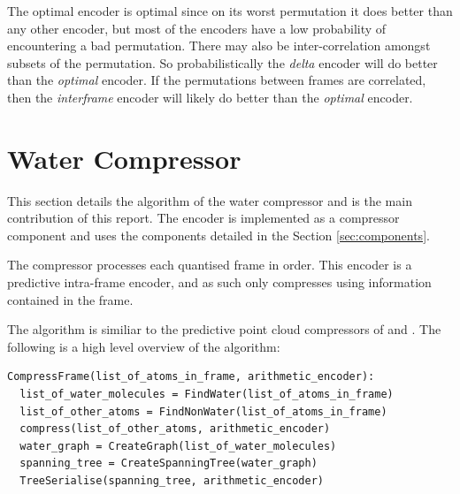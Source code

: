 \documentclass[a4paper]{report}
\begin{document}
\begin{table}
  \center
  \caption{Number of bytes needed for storing permutations of different
    sizes. See Equation (\ref{eq:optimal-lowerbound}) for the lower bound. The
    effective upper-bound is
    $\lceil\log_2(N)\rceil/8$.} \label{tab:optimal-lowerbound}
\end{table}

The optimal encoder is optimal since on its worst permutation it does better
than any other encoder, but most of the encoders have a low probability of
encountering a bad permutation. There may also be inter-correlation amongst
subsets of the permutation. So probabilistically the \emph{delta} encoder will
do better than the \emph{optimal} encoder. If the permutations between frames
are correlated, then the \emph{interframe} encoder will likely do better than
the \emph{optimal} encoder.


\section{Water Compressor}

This section details the algorithm of the water compressor and is the main
contribution of this report. The encoder is implemented as a compressor
component and uses the components detailed in the Section
\ref{sec:components}.

The compressor processes each quantised frame in order. This encoder is a
predictive intra-frame encoder, and as such only compresses using information
contained in the frame.

The algorithm is similiar to the predictive point cloud compressors of
\citet{gumholdcomp} and \citet{merrycomp}. The following is a high level
overview of the algorithm:

\begin{verbatim}
CompressFrame(list_of_atoms_in_frame, arithmetic_encoder):
  list_of_water_molecules = FindWater(list_of_atoms_in_frame)
  list_of_other_atoms = FindNonWater(list_of_atoms_in_frame)
  compress(list_of_other_atoms, arithmetic_encoder)
  water_graph = CreateGraph(list_of_water_molecules)
  spanning_tree = CreateSpanningTree(water_graph)
  TreeSerialise(spanning_tree, arithmetic_encoder)
\end{verbatim}
\end{document}
